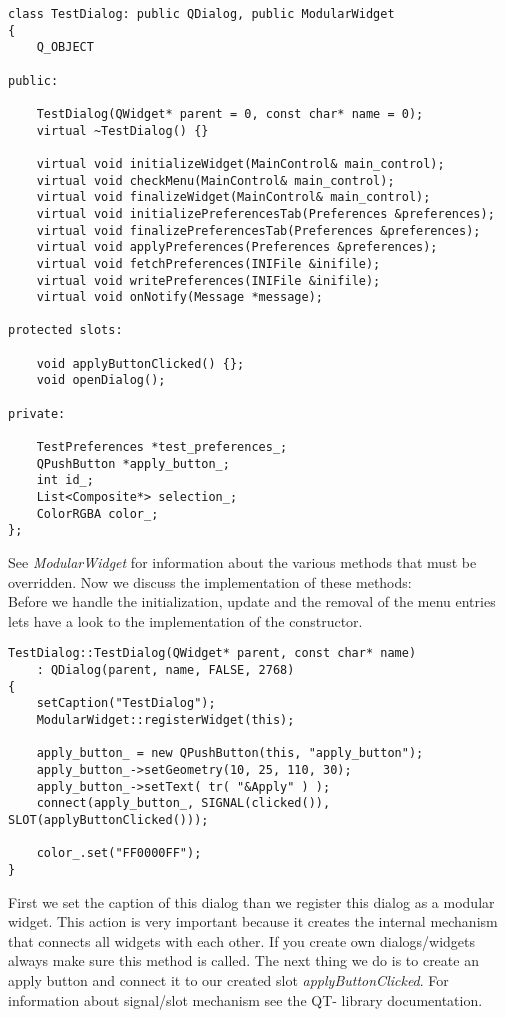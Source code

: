 \begin{verbatim}
class TestDialog: public QDialog, public ModularWidget
{
	Q_OBJECT

public:

	TestDialog(QWidget* parent = 0, const char* name = 0);
	virtual ~TestDialog() {}

	virtual void initializeWidget(MainControl& main_control);
	virtual void checkMenu(MainControl& main_control);
	virtual void finalizeWidget(MainControl& main_control);
	virtual void initializePreferencesTab(Preferences &preferences);
	virtual void finalizePreferencesTab(Preferences &preferences);
	virtual void applyPreferences(Preferences &preferences);
	virtual void fetchPreferences(INIFile &inifile);
	virtual void writePreferences(INIFile &inifile);
	virtual void onNotify(Message *message);

protected slots:
			
	void applyButtonClicked() {};
	void openDialog();

private:

	TestPreferences *test_preferences_;
	QPushButton *apply_button_;
	int id_;
	List<Composite*> selection_;
	ColorRGBA color_;
};
\end{verbatim}

See {\em ModularWidget} for information about the various methods that must be
overridden.
Now we discuss the implementation of these methods:\\

Before we handle the initialization, update and the removal of the menu entries lets
have a look to the implementation of the constructor.

\begin{verbatim}
TestDialog::TestDialog(QWidget* parent, const char* name)
	: QDialog(parent, name, FALSE, 2768)
{
	setCaption("TestDialog");
	ModularWidget::registerWidget(this);

	apply_button_ = new QPushButton(this, "apply_button");
	apply_button_->setGeometry(10, 25, 110, 30);
	apply_button_->setText( tr( "&Apply" ) );
	connect(apply_button_, SIGNAL(clicked()), SLOT(applyButtonClicked()));

	color_.set("FF0000FF");
}
\end{verbatim}

First we set the caption of this dialog than we register this dialog as a modular
widget. This action is very important because it creates the internal mechanism
that connects all widgets with each other. If you create own dialogs/widgets always
make sure this method is called.
The next thing we do is to create an apply button and connect it to our created slot
{\em applyButtonClicked}. For information about signal/slot mechanism see the QT-
library documentation.\\

